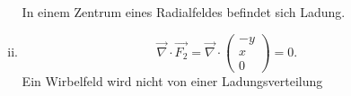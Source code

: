 \begin{enumerate}[(a)]
\begin{enumerate}[(i)]
\begin{equation*}
\end{equation*}
In einem Zentrum eines Radialfeldes befindet sich Ladung.
\item
\begin{equation*}
\vec{\nabla} \cdot \vec{F_{2}} = \vec{\nabla} \cdot \begin{pmatrix} -y \\ x \\ 0 \end{pmatrix} = 0.
\end{equation*}
Ein Wirbelfeld wird nicht von einer Ladungsverteilung 
\end{enumerate}
\end{enumerate}
